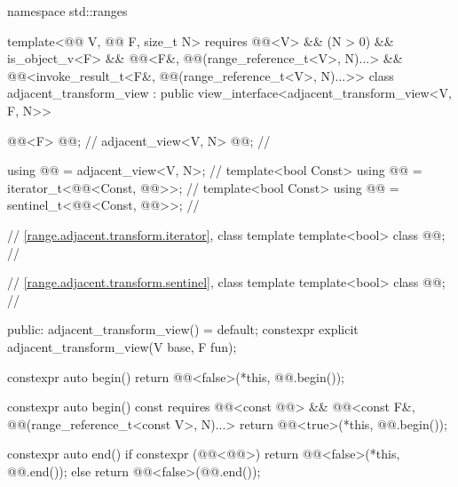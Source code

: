 %
%
%
\begin{codeblock}
namespace std::ranges {
  template<@@ V, @@ F, size_t N>
   requires @@<V> && (N > 0) && is_object_v<F> &&
            @@<F&, @@(range_reference_t<V>, N)...> &&
            @@<invoke_result_t<F&, @@(range_reference_t<V>, N)...>>
  class adjacent_transform_view : public view_interface<adjacent_transform_view<V, F, N>> {
    @@<F> @@;                        // \expos
    adjacent_view<V, N> @@;                 // \expos

    using @@ = adjacent_view<V, N>;      // \expos
    template<bool Const>
      using @@ = iterator_t<@@<Const, @@>>;         // \expos
    template<bool Const>
      using @@ = sentinel_t<@@<Const, @@>>;         // \expos

    // \ref{range.adjacent.transform.iterator}, class template 
    template<bool> class @@;              // \expos

    // \ref{range.adjacent.transform.sentinel}, class template 
    template<bool> class @@;              // \expos

  public:
    adjacent_transform_view() = default;
    constexpr explicit adjacent_transform_view(V base, F fun);

    constexpr auto begin() {
      return @@<false>(*this, @@.begin());
    }

    constexpr auto begin() const
      requires @@<const @@> &&
               @@<const F&, @@(range_reference_t<const V>, N)...> {
      return @@<true>(*this, @@.begin());
    }

    constexpr auto end() {
      if constexpr (@@<@@>) {
        return @@<false>(*this, @@.end());
      } else {
        return @@<false>(@@.end());
      }
    }

}}
\end{codeblock}
